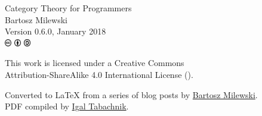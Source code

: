 \vspace*{\fill}
\thispagestyle{empty}

\begin{small}
\begin{center}

\noindent
Category Theory for Programmers\\

\vspace{1.0em}
\noindent
Bartosz Milewski\\

\vspace{1.26em}
\noindent
Version 0.6.0, January 2018\\

\vspace{1.6em}
\noindent
\includegraphics[width=3mm]{fig/icons/cc.pdf}
\includegraphics[width=3mm]{fig/icons/by.pdf}
\includegraphics[width=3mm]{fig/icons/sa.pdf}

\vspace{0.4em}
\noindent
This work is licensed under a Creative Commons\\
Attribution-ShareAlike 4.0 International License
(\href{http://creativecommons.org/licenses/by-sa/4.0/}{}).

\vspace{1.26em}
\noindent
Converted to \LaTeX{} from a series of blog posts by \href{https://bartoszmilewski.com/2014/10/28/category-theory-for-programmers-the-preface/}{Bartosz Milewski}.\\
PDF compiled by \href{https://github.com/hmemcpy/milewski-ctfp-pdf}{Igal Tabachnik}.\\

\end{center}
\end{small}